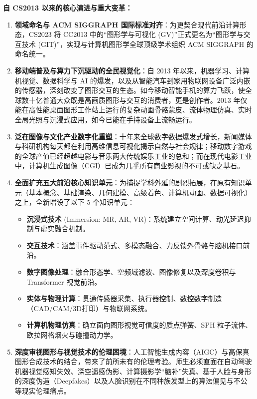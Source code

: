 \begin{preamblebox}[知识领域概述与变革]
\textbf{自 CS2013 以来的核心演进与重大变革：}
\begin{enumerate}
    \item \textbf{领域命名与 ACM SIGGRAPH 国际标准对齐}：为更契合现代前沿计算形态，CS2023 将 CC2013 中的“图形学与可视化 (GV)”正式更名为“图形学与交互技术 (GIT)”，实现与计算机图形学全球顶级学术组织 ACM SIGGRAPH 的命名统一。
    \item \textbf{移动端普及与算力下沉驱动的全民视觉化}：自 2013 年以来，机器学习、计算机视觉、数据科学与 AI 的爆发，以及从智能汽车到家用物联网设备广泛内嵌的传感器，深刻改变了图形交互的生态。如今移动智能手机的算力飞跃，使全球数十亿普通大众既是高画质图形与交互的消费者，更是创作者。2013 年仅能在高性能桌面图形工作站上运行的复杂动画骨骼蒙皮、流体物理仿真、实时全局光照与沉浸式应用，如今已能在手持设备上流畅运行。
    \item \textbf{泛在图像与文化产业数字化重塑}：十年来全球数字数据爆发式增长，新闻媒体与科研机构每天都在利用高维信息可视化揭示自然与社会规律；移动数字游戏的全球产值已经超越电影与音乐两大传统娱乐工业的总和；而在现代电影工业中，计算机生成图像（CGI）已成为几乎所有商业影视的不可或缺之基石。
    \item \textbf{全面扩充五大前沿核心知识单元}：为捕捉学科外延的剧烈拓展，在原有知识单元（基本概念、基础渲染、几何建模、高级着色、计算机动画、数据可视化）之上，全新增设了以下 5 个知识单元：
    \begin{itemize}
        \item \textbf{沉浸式技术} (Immersion: MR, AR, VR)：系统建立空间计算、动光延迟抑制与虚实融合机制。
        \item \textbf{交互技术}：涵盖事件驱动范式、多模态融合、力反馈外骨骼与脑机接口前沿。
        \item \textbf{数字图像处理}：融合形态学、空频域滤波、图像修复以及深度卷积与 Transformer 视觉前沿。
        \item \textbf{实体与物理计算}：贯通传感器采集、执行器控制、数控数字制造（CAD/CAM/3D打印）与物联网系统。
        \item \textbf{计算机物理仿真}：确立面向图形视觉可信度的质点弹簧、SPH 粒子流体、欧拉网格烟火与碰撞动力学。
    \end{itemize}
    \item \textbf{深度审视图形与视觉技术的伦理困境}：人工智能生成内容（AIGC）与高保真图形合成技术的结合，带来了前所未有的伦理考验。师生必须直面在自动驾驶机器视觉感知失效、深空遥感伪影、计算摄影学“脑补”失真、基于人脸与身形的深度伪造（Deepfakes）以及人脸识别在不同种族发型上的算法偏见与不公等现实伦理痛点。
\end{enumerate}
\end{preamblebox}

